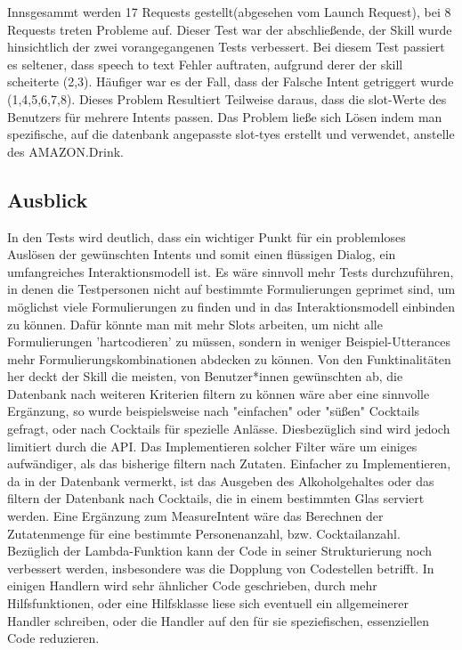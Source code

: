 \documentclass[12pt,letterpaper]{article}
\begin{document}
Innsgesammt werden 17 Requests gestellt(abgesehen vom Launch Request), bei 8 Requests treten Probleme auf. Dieser Test war der abschließende, der Skill wurde hinsichtlich der zwei vorangegangenen Tests verbessert. Bei diesem Test passiert es seltener, dass speech to text Fehler auftraten, aufgrund derer der skill scheiterte (2,3). Häufiger war es der Fall, dass der Falsche Intent getriggert wurde (1,4,5,6,7,8). Dieses Problem Resultiert Teilweise daraus, dass die slot-Werte des Benutzers für mehrere Intents passen. Das Problem ließe sich Lösen indem man spezifische, auf die datenbank angepasste slot-tyes erstellt und verwendet, anstelle des AMAZON.Drink.

\subsection{Ausblick}
In den Tests wird deutlich, dass ein wichtiger Punkt für ein problemloses Auslösen der gewünschten Intents und somit einen flüssigen Dialog, ein umfangreiches Interaktionsmodell ist. Es wäre sinnvoll mehr Tests durchzuführen, in denen die Testpersonen nicht auf bestimmte Formulierungen geprimet sind, um möglichst viele Formulierungen zu finden und in das Interaktionsmodell einbinden zu können. Dafür könnte man mit mehr Slots arbeiten, um nicht alle Formulierungen 'hartcodieren' zu müssen, sondern in weniger Beispiel-Utterances mehr Formulierungskombinationen abdecken zu können. Von den Funktinalitäten her deckt der Skill die meisten, von Benutzer*innen gewünschten ab, die Datenbank nach weiteren Kriterien filtern zu können wäre aber eine sinnvolle Ergänzung, so wurde beispielsweise nach "einfachen" oder "süßen" Cocktails gefragt, oder nach Cocktails für spezielle Anlässe. Diesbezüglich sind wird jedoch limitiert durch die API. Das Implementieren solcher Filter wäre um einiges aufwändiger, als das bisherige filtern nach Zutaten. Einfacher zu Implementieren, da in der Datenbank vermerkt, ist das Ausgeben des Alkoholgehaltes oder das filtern der Datenbank nach Cocktails, die in einem bestimmten Glas serviert werden. Eine Ergänzung zum MeasureIntent wäre das Berechnen der Zutatenmenge für eine bestimmte Personenanzahl, bzw. Cocktailanzahl.
Bezüglich der Lambda-Funktion kann der Code in seiner Strukturierung noch verbessert werden, insbesondere was die Dopplung von Codestellen betrifft. In einigen Handlern wird sehr ähnlicher Code geschrieben, durch mehr Hilfsfunktionen, oder eine Hilfsklasse liese sich eventuell ein allgemeinerer Handler schreiben, oder die Handler auf den für sie speziefischen, essenziellen Code reduzieren. 
\end{document}

